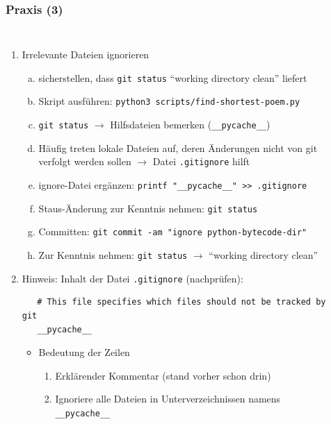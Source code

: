 \documentclass{beamer}
\begin{document}
\begin{frame}[fragile,label=uebung30]
\frametitle{Praxis (3)}
\begin{columns}
\begin{enumerate}
 \setcounter{enumi}{\value{taskcounter}}

  \item Irrelevante Dateien ignorieren
  \begin{enumerate}[a)]
   \item sicherstellen, dass \verb|git status| "`working directory clean"' liefert
   \item Skript ausführen: \verb|python3 scripts/find-shortest-poem.py|
   \item \verb|git status| $\rightarrow$ Hilfsdateien bemerken (\verb|__pycache__|)
   \item[] {\scriptsize Häufig treten lokale Dateien auf, deren Änderungen nicht von git verfolgt werden sollen
   $\rightarrow$ Datei \verb|.gitignore| hilft}
   \item ignore-Datei ergänzen: \verb|printf "__pycache__" >> .gitignore|
   \item Staus-Änderung zur Kenntnis nehmen: \verb|git status|
   \item Committen: \verb|git commit -am "ignore python-bytecode-dir"|
\smallskip
   \item Zur Kenntnis nehmen: \verb|git status| $\rightarrow$ "`working directory clean"'
  \end{enumerate}
  \item[] Hinweis: Inhalt der Datei \verb|.gitignore| (nachprüfen):
  {\scriptsize
  \begin{verbatim}
   # This file specifies which files should not be tracked by git
   __pycache__
  \end{verbatim}
  }
  \vspace{-3mm}
  \begin{itemize}
  \item Bedeutung der Zeilen
  \begin{enumerate}
   \item Erklärender Kommentar (stand vorher schon drin)
   \item Ignoriere alle Dateien in Unterverzeichnissen namens \verb|__pycache__|
  \end{enumerate}

  \end{itemize}
 \setcounter{taskcounter}{\value{enumi}}
\end{enumerate}
  ~
\end{columns}
\end{frame}
\end{document}
